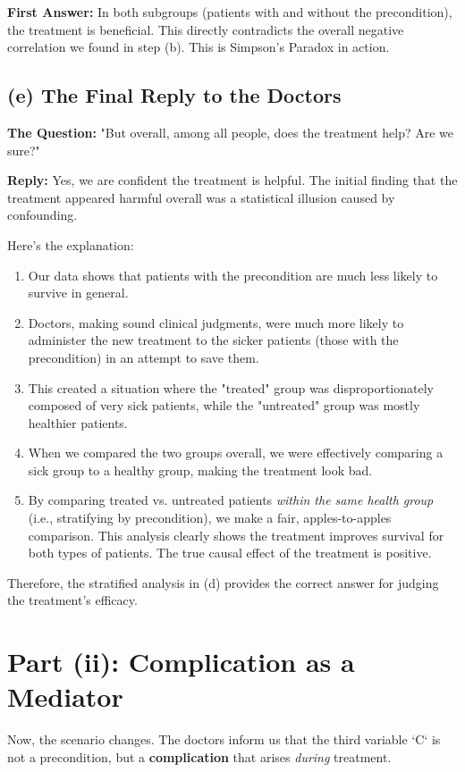 \documentclass[11pt,a4paper]{article}
\begin{document}
\textbf{First Answer:} In both subgroups (patients with and without the precondition), the treatment is beneficial. This directly contradicts the overall negative correlation we found in step (b). This is Simpson's Paradox in action.

\subsection{(e) The Final Reply to the Doctors}
\textbf{The Question:} "But overall, among all people, does the treatment help? Are we sure?"

\textbf{Reply:}
Yes, we are confident the treatment is helpful. The initial finding that the treatment appeared harmful overall was a statistical illusion caused by confounding.

Here's the explanation:
\begin{enumerate}
    \item Our data shows that patients with the precondition are much less likely to survive in general.
    \item Doctors, making sound clinical judgments, were much more likely to administer the new treatment to the sicker patients (those with the precondition) in an attempt to save them.
    \item This created a situation where the "treated" group was disproportionately composed of very sick patients, while the "untreated" group was mostly healthier patients.
    \item When we compared the two groups overall, we were effectively comparing a sick group to a healthy group, making the treatment look bad.
    \item By comparing treated vs. untreated patients \textit{within the same health group} (i.e., stratifying by precondition), we make a fair, apples-to-apples comparison. This analysis clearly shows the treatment improves survival for both types of patients. The true causal effect of the treatment is positive.
\end{enumerate}

Therefore, the stratified analysis in (d) provides the correct answer for judging the treatment's efficacy.

\section{Part (ii): Complication as a Mediator}

Now, the scenario changes. The doctors inform us that the third variable `C` is not a precondition, but a \textbf{complication} that arises \textit{during} treatment.
\end{document}
